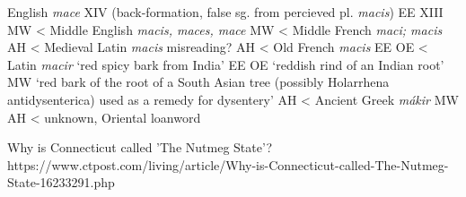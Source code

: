 \begin{etymology}
English \textit{mace} XIV (back-formation, false sg. from percieved pl. \textit{macis}) EE XIII MW
< Middle English \textit{macis, maces, mace} MW
< Middle French \textit{maci; macis} AH
< Medieval Latin \textit{macis} misreading? AH
< Old French \textit{macis} EE OE
< Latin \textit{macir} `red spicy bark from India' EE OE `reddish rind of an Indian root' MW `red bark of the root of a South Asian tree (possibly Holarrhena antidysenterica) used as a remedy for dysentery' AH
< Ancient Greek \textit{mákir} MW AH
< unknown, Oriental loanword 
\end{etymology}










Why is Connecticut called 'The Nutmeg State'?
https://www.ctpost.com/living/article/Why-is-Connecticut-called-The-Nutmeg-State-16233291.php